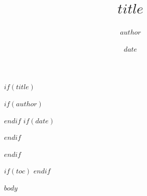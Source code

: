 \documentclass[12pt,a4paper]{article}
\begin{document}
$if(title)$
\title{$title$}
$if(author)$
\author{$author$}
$endif$
$if(date)$
\date{$date$}
$endif$
\maketitle
$endif$

$if(toc)$
\tableofcontents
$endif$

$body$
\end{document}
